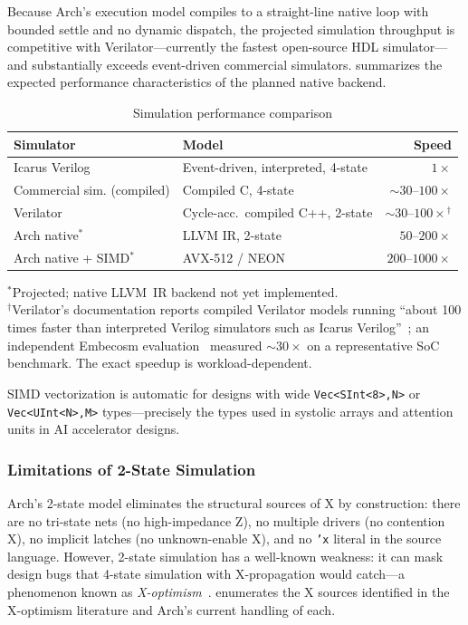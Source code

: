 \documentclass[11pt,twocolumn]{article}
\begin{document}
Because Arch's execution model compiles to a straight-line native loop with bounded settle and no dynamic dispatch, the projected simulation throughput is competitive with Verilator---currently the fastest open-source HDL simulator---and substantially exceeds event-driven commercial simulators.  summarizes the expected performance characteristics of the planned native backend.

\begin{table}[!t]
\centering
\caption{Simulation performance comparison}
\label{tab:perf}
\footnotesize
\begin{tabular}{@{}llr@{}}
\toprule
\textbf{Simulator} & \textbf{Model} & \textbf{Speed} \\
\midrule
Icarus Verilog~\cite{icarus} & Event-driven, interpreted, 4-state & $1\times$ \\
Commercial sim. (compiled) & Compiled C, 4-state & ${\sim}30$--$100\times$ \\
Verilator~\cite{verilator} & Cycle-acc.\ compiled C++, 2-state & ${\sim}30$--$100\times$$^\dagger$ \\
Arch native$^\ast$ & LLVM IR, 2-state & $50$--$200\times$ \\
Arch native + SIMD$^\ast$ & AVX-512 / NEON & $200$--$1000\times$ \\
\bottomrule
\end{tabular}

\vspace{0.4em}
\raggedright\footnotesize
$^\ast$Projected; native LLVM~IR backend not yet implemented.\\
$^\dagger$Verilator's documentation reports compiled Verilator models running ``about 100 times faster than interpreted Verilog simulators such as Icarus Verilog''~\cite{verilator}; an independent Embecosm evaluation~\cite{embecosm2013} measured ${\sim}30\times$ on a representative SoC benchmark. The exact speedup is workload-dependent.
\end{table}

SIMD vectorization is automatic for designs with wide \texttt{Vec<SInt<8>,N>} or \texttt{Vec<UInt<N>,M>} types---precisely the types used in systolic arrays and attention units in AI accelerator designs.

\subsubsection{Limitations of 2-State Simulation}

Arch's 2-state model eliminates the structural sources of X by construction: there are no tri-state nets (no high-impedance Z), no multiple drivers (no contention X), no implicit latches (no unknown-enable X), and no \texttt{'x} literal in the source language. However, 2-state simulation has a well-known weakness: it can mask design bugs that 4-state simulation with X-propagation would catch---a phenomenon known as \emph{X-optimism}~\cite{zhao2014xoptimism}.  enumerates the X sources identified in the X-optimism literature and Arch's current handling of each.
\end{document}
